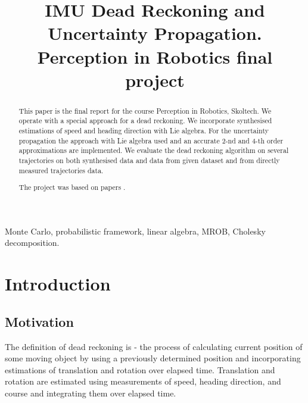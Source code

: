 \documentclass{article}
\begin{document}
\title{IMU Dead Reckoning and Uncertainty Propagation. Perception in Robotics final project}

\author{
	\and
	\and
}

\maketitle

\begin{abstract}
	This paper is the final report for the course Perception in Robotics, Skoltech. We operate with a special approach for a dead reckoning. We incorporate synthesised estimations of speed and heading direction with Lie algebra. For the uncertainty propagation the approach with Lie algebra used and an accurate 2-nd and 4-th order approximations are implemented. We evaluate the dead reckoning algorithm on several trajectories on both synthesised data and data from given dataset and from directly measured trajectories data. 
	
	The project was based on papers \cite{Barfoot, Brossard, Forster, Mangelson}.
	
\end{abstract}

\begin{IEEEkeywords}
	Monte Carlo, probabilistic framework, linear algebra, MROB, Cholesky decomposition.
\end{IEEEkeywords}

\section{Introduction}

\subsection{Motivation}

The definition of dead reckoning is - the process of calculating current position of some moving object by using a previously determined position and incorporating estimations of translation and rotation over elapsed time. Translation and rotation are estimated using measurements of speed, heading direction, and course and integrating them over elapsed time.
\end{document}
